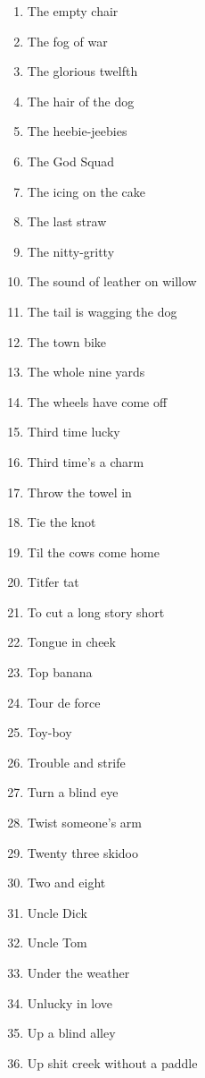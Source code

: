 \begin{enumerate}
        \item  The empty chair
        \item  The fog of war
        \item  The glorious twelfth
        \item  The hair of the dog
        \item  The heebie-jeebies
        \item  The God Squad
        \item  The icing on the cake
        \item  The last straw
        \item  The nitty-gritty
        \item  The sound of leather on willow
        \item  The tail is wagging the dog
        \item  The town bike
        \item  The whole nine yards
        \item  The wheels have come off
        \item  Third time lucky
        \item  Third time's a charm
        \item  Throw the towel in
        \item  Tie the knot
        \item  Til the cows come home
        \item  Titfer tat
        \item  To cut a long story short
        \item  Tongue in cheek
        \item  Top banana
        \item  Tour de force
        \item  Toy-boy
        \item  Trouble and strife
        \item  Turn a blind eye
        \item  Twist someone's arm
        \item  Twenty three skidoo
        \item  Two and eight
        \item  Uncle Dick
        \item  Uncle Tom
        \item  Under the weather
        \item  Unlucky in love
        \item  Up a blind alley
        \item  Up shit creek without a paddle

\end{enumerate}
